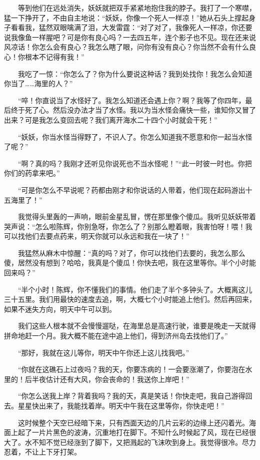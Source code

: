 　　等到他们在远处消失，妖妖就把双手紧紧地抱住我的脖子。我打了一个寒噤，猛一下挣开了，不由自主地说：“妖妖，你像一个死人一样凉！”她从石头上撑起身子看看我，猛然双眼噙满了泪，大发雷霆：“对了对了，我像死人一样凉，你还要说我像鱼一样腥吧？可是你有良心吗？一去四五年，连个影子也不见。现在还来说风凉话！你怎么会有良心？我怎么瞎了眼，问你有没有良心？你当然不会有什么良心！你根本不记得有我！” 
 
 　　我吃了一惊：“你怎么了？你为什么要说这种话？我到处找你！我怎么会知道你当了……海里的人？” 
 
 　　“啐！你直说当了水怪好了。我怎么知道还会遇上你？啊？我等了你四年，最后终于死了心。然后没办法才当了水怪。我以为当水怪会痛快一些，谁知你又冒了出来？可是我怎么变回去呢？我们离开海水二十四个小时就会干死！” 
 
 　　“妖妖，你当水怪当得野了，不识人了。你怎么知道我不愿意和你一起当水怪了呢？” 
 
 　　“啊？真的吗？我刚才还听见你说死也不当水怪呢！”“此一时彼一时也。你把你们的药拿来吧。” 
 
 　　“可是你怎么不早说呢？药都由刚才和你说话的人带着，他们现在起码游出十五海里了！” 
 
 　　我觉得头里轰的一声响，眼前金星乱冒，愣在那里像个傻瓜。我听见妖妖带着哭声说：“怎么啦陈辉，你别急呀，你怎么了？别那么瞪着眼，我害怕呀！喂！我可以找他们去要点药来，明天你就可以永远和我在一块了！” 
 
 　　我猛然从麻木中惊醒：“真的吗？对了，你可以找他们去要的，我怎么那么傻，居然没有想到？哈哈，我真是个傻瓜！你快去吧，我在这里等你。半个小时能回来吗？” 
 
 　　“半个小时！陈辉，你不懂我们的事情。他们走了半个多钟头了。大概离这儿三十五里。我们用最快的速度去追，啊，大概七个小时能追上他们。然后再回来，如果不迷失方向，明天中午可以到。 
 
 　　我们这些人根本就不会慢慢遛哒，在海里总是高速行驶，谁要是晚走一天就得拼命地赶一个月。我大概不能在途中追上他们，得到济州岛去找他们了。” 
 
 　　“那好，我就在这儿等你，明天中午你还上这儿找我吧。” 
 
 　　“你就在这礁石上过夜吗？我的天，你要冻病的！一会要涨潮了，你要泡在水里的！后半夜估计还有大风，你会丧命的！我送你上岸吧！” 
 
 　　“你怎么送我上岸？背着我吗？我的天，真是笑话！你快走吧，我自己游得回去。星星快出来了，我能找着岸。明天中午我在这里等你，你快走吧！” 
 
 　　这时候整个天空已经暗下来，只有西面天边的几片云彩的边缘上还闪着光。海面上起了一片片黑色的波涛，沉重地打在脚下。不知什么时候起了风，现在已经很大了。水不知不觉已经涨到了脚下，又把溅起的飞沫吹到身上。我觉得很冷。尽力忍着，不让上下牙打架。 
 
